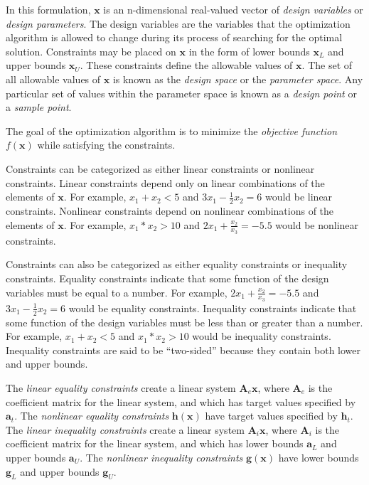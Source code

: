 In this formulation, $\textbf{x}$ is an n-dimensional real-valued vector of \textit{design variables} or \textit{design parameters}.
The design variables are the variables that the optimization algorithm is allowed to change during its process of searching for the optimal solution.
Constraints may be placed on $\textbf{x}$ in the form of lower bounds $\textbf{x}_L$ and upper bounds $\textbf{x}_U$.
These constraints define the allowable values of $\textbf{x}$.
The set of all allowable values of $\textbf{x}$ is known as the \textit{design space} or the \textit{parameter space}.
Any particular set of values within the parameter space is known as a \textit{design point} or a \textit{sample point}.

The goal of the optimization algorithm is to minimize the \textit{objective function} $f\left(\textbf{x}\right)$ while satisfying the constraints.

Constraints can be categorized as either linear constraints or nonlinear constraints.
Linear constraints depend only on linear combinations of the elements of $\textbf{x}$.
For example, $x_1 + x_2 < 5$ and $3x_1 - \frac{1}{2}x_2 = 6$ would be linear constraints.
Nonlinear constraints depend on nonlinear combinations of the elements of $\textbf{x}$.
For example, $x_1 * x_2 > 10$ and $2x_1 + \frac{x_2}{x_3} = -5.5$ would be nonlinear constraints.

Constraints can also be categorized as either equality constraints or inequality constraints.
Equality constraints indicate that some function of the design variables must be equal to a number.
For example, $2x_1 + \frac{x_2}{x_3} = -5.5$ and $3x_1 - \frac{1}{2}x_2 = 6$ would be equality constraints.
Inequality constraints indicate that some function of the design variables must be less than or greater than a number.
For example, $x_1 + x_2 < 5$ and $x_1 * x_2 > 10$ would be inequality constraints.
Inequality constraints are said to be ``two-sided'' because they contain both lower and upper bounds.

The \textit{linear equality constraints} create a linear system $\textbf{A}_e\textbf{x}$, where ${\textbf{A}_e}$ is the coefficient matrix for the linear system, and which has target values specified by ${\textbf{a}_t}$.
The \textit{nonlinear equality constraints} ${\textbf{h}\left(\textbf{x}\right)}$ have target values specified by $\textbf{h}_t$.
The \textit{linear inequality constraints} create a linear system $\textbf{A}_i\textbf{x}$, where ${\textbf{A}_i}$ is the coefficient matrix for the linear system, and which has lower bounds $\textbf{a}_L$ and upper bounds $\textbf{a}_U$.
The \textit{nonlinear inequality constraints} $\textbf{g}\left(\textbf{x}\right)$ have lower bounds $\textbf{g}_L$ and upper bounds $\textbf{g}_U$.

